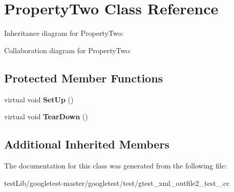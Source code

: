 \hypertarget{classPropertyTwo}{}\section{Property\+Two Class Reference}
\label{classPropertyTwo}


Inheritance diagram for Property\+Two\+:


Collaboration diagram for Property\+Two\+:
\subsection*{Protected Member Functions}
\begin{DoxyCompactItemize}
\item 
\mbox{\label{classPropertyTwo_aa3ab39cf4e6c751cb0788c575bf92ca2}} 
virtual void {\bfseries Set\+Up} ()
\item 
\mbox{\label{classPropertyTwo_aa4ffb2b9dddeba69f0f9baf133f06ef2}} 
virtual void {\bfseries Tear\+Down} ()
\end{DoxyCompactItemize}
\subsection*{Additional Inherited Members}


The documentation for this class was generated from the following file\+:\begin{DoxyCompactItemize}
\item 
test\+Lib/googletest-\/master/googletest/test/gtest\+\_\+xml\+\_\+outfile2\+\_\+test\+\_\+.\+cc\end{DoxyCompactItemize}

